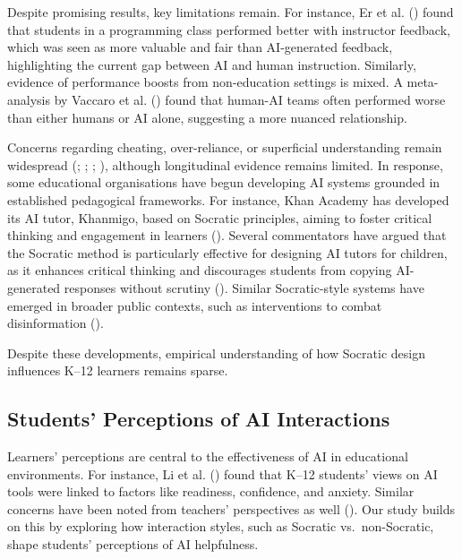\documentclass[
  11pt,
]{article}
\begin{document}
Despite promising results, key limitations remain. For instance, Er et al. () found that students in a programming class performed better with instructor feedback, which was seen as more valuable and fair than AI-generated feedback, highlighting the current gap between AI and human instruction. Similarly, evidence of performance boosts from non-education settings is mixed. A meta-analysis by Vaccaro et al. () found that human-AI teams often performed worse than either humans or AI alone, suggesting a more nuanced relationship.

Concerns regarding cheating, over-reliance, or superficial understanding remain widespread (; ; ; ), although longitudinal evidence remains limited. In response, some educational organisations have begun developing AI systems grounded in established pedagogical frameworks. For instance, Khan Academy has developed its AI tutor, Khanmigo, based on Socratic principles, aiming to foster critical thinking and engagement in learners (). Several commentators have argued that the Socratic method is particularly effective for designing AI tutors for children, as it enhances critical thinking and discourages students from copying AI-generated responses without scrutiny (). Similar Socratic-style systems have emerged in broader public contexts, such as interventions to combat disinformation ().

Despite these developments, empirical understanding of how Socratic design influences K--12 learners remains sparse.

\subsection{Students' Perceptions of AI Interactions}\label{students-perceptions-of-ai-interactions}

Learners' perceptions are central to the effectiveness of AI in educational environments. For instance, Li et al. () found that K--12 students' views on AI tools were linked to factors like readiness, confidence, and anxiety. Similar concerns have been noted from teachers' perspectives as well (). Our study builds on this by exploring how interaction styles, such as Socratic vs.~non-Socratic, shape students' perceptions of AI helpfulness.
\end{document}
